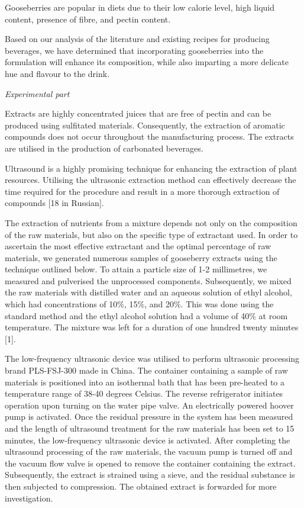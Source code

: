 \begin{multicols}{2}

Gooseberries are popular in diets due to their low calorie level, high
liquid content, presence of fibre, and pectin content.~

Based on our analysis of the literature and existing recipes for
producing beverages, we have determined that incorporating gooseberries
into the formulation will enhance its composition, while also imparting
a more delicate hue and flavour to the drink.

\emph{Experimental part}

Extracts are highly concentrated juices that are free of pectin and can
be produced using sulfitated materials. Consequently, the extraction of
aromatic compounds does not occur throughout the manufacturing process.
The extracts are utilised in the production of carbonated beverages.~

Ultrasound is a highly promising technique for enhancing the extraction
of plant resources. Utilising the ultrasonic extraction method can
effectively decrease the time required for the procedure and result in a
more thorough extraction of compounds {[}18 in Russian{]}.~

The extraction of nutrients from a mixture depends not only on the
composition of the raw materials, but also on the specific type of
extractant used. In order to ascertain the most effective extractant and
the optimal percentage of raw materials, we generated numerous samples
of gooseberry extracts using the technique outlined below. To attain a
particle size of 1-2 millimetres, we measured and pulverised the
unprocessed components. Subsequently, we mixed the raw materials with
distilled water and an aqueous solution of ethyl alcohol, which had
concentrations of 10\%, 15\%, and 20\%. This was done using the standard
method and the ethyl alcohol solution had a volume of 40\% at room
temperature. The mixture was left for a duration of one hundred twenty
minutes {[}1{]}.~

The low-frequency ultrasonic device was utilised to perform ultrasonic
processing brand PLS-FSJ-300 made in China. The container containing a
sample of raw materials is positioned into an isothermal bath that has
been pre-heated to a temperature range of 38-40 degrees Celsius. The
reverse refrigerator initiates operation upon turning on the water pipe
valve. An electrically powered hoover pump is activated. Once the
residual pressure in the system has been measured and the length of
ultrasound treatment for the raw materials has been set to 15 minutes,
the low-frequency ultrasonic device is activated. After completing the
ultrasound processing of the raw materials, the vacuum pump is turned
off and the vacuum flow valve is opened to remove the container
containing the extract. Subsequently, the extract is strained using a
sieve, and the residual substance is then subjected to compression. The
obtained extract is forwarded for more investigation.~


\end{multicols}
